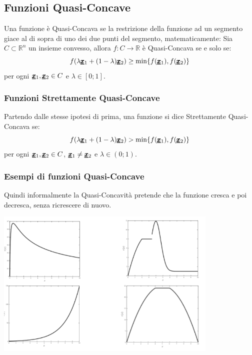 \subsection{Funzioni Quasi-Concave}
Una funzione è Quasi-Concava se la restrizione della funzione ad un segmento giace al di sopra di uno dei due punti del segmento, matematicamente:
Sia $C \subset \mathbb{R}^n$ un insieme convesso, allora $f: C \longrightarrow \mathbb{R}$ è Quasi-Concava se e solo se:
\begin{equation*}
    f(\lambda \pmb{\underline{x}}_1 + (1 - \lambda)\pmb{\underline{x}}_2) \geq \min\{f(\pmb{\underline{x}}_1), f(\pmb{\underline{x}}_2) \}
\end{equation*}
per ogni $\pmb{\underline{x}}_1, \pmb{\underline{x}}_2 \in C$ e $\lambda \in [0;1]$.
\subsubsection{Funzioni Strettamente Quasi-Concave}
Partendo dalle stesse ipotesi di prima, una funzione si dice Strettamente Quasi-Concava se:
\begin{equation*}
        f(\lambda \pmb{\underline{x}}_1 + (1 - \lambda)\pmb{\underline{x}}_2) > \min\{f(\pmb{\underline{x}}_1), f(\pmb{\underline{x}}_2) \}
\end{equation*}
per ogni $\pmb{\underline{x}}_1, \pmb{\underline{x}}_2 \in C$, $\pmb{\underline{x}}_1 \neq \pmb{\underline{x}}_2$ e $\lambda \in (0;1)$.\\

\subsubsection{Esempi di funzioni Quasi-Concave}
Quindi informalmente la Quasi-Concavità pretende che la funzione cresca e poi decresca, senza ricrescere di nuovo.
\begin{center}
    \includegraphics[width=0.8\textwidth]{Images/QuasiConcave.png}
\end{center}


